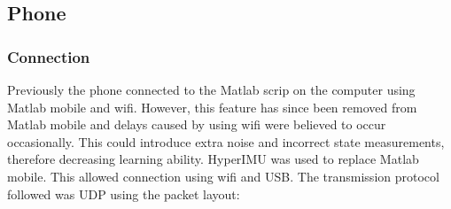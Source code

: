 \documentclass[twoside,twocolumn,12pt]{article}
\begin{document}
\clearpage
{}


\clearpage
{}

\clearpage
\subsection{Phone}
\subsubsection{Connection}
Previously the phone connected to the Matlab scrip on the computer using Matlab mobile and wifi. However, this feature has since been removed from Matlab mobile and delays caused by using wifi were believed to occur occasionally. This could introduce extra noise and incorrect state measurements, therefore decreasing learning ability.
\newline
HyperIMU \cite{ianovir} was used to replace Matlab mobile. This allowed connection using wifi and USB. The transmission protocol followed was UDP using the packet layout:
\end{document}
